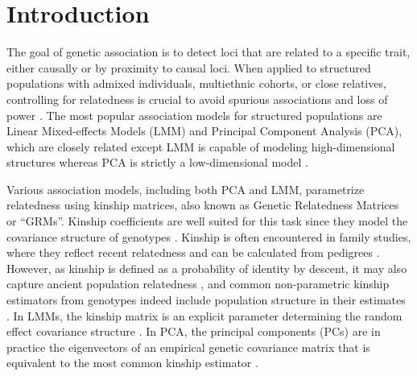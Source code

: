 \documentclass[11pt]{article}
\begin{document}
\clearpage

\section{Introduction}

The goal of genetic association is to detect loci that are related to a specific trait, either causally or by proximity to causal loci.
When applied to structured populations with admixed individuals, multiethnic cohorts, or close relatives, controlling for relatedness is crucial to avoid spurious associations and loss of power \citep{devlin_genomic_1999, voight_confounding_2005, astle_population_2009, yao_limitations_2022}.
The most popular association models for structured populations are Linear Mixed-effects Models (LMM) and Principal Component Analysis (PCA), which are closely related except LMM is capable of modeling high-dimensional structures whereas PCA is strictly a low-dimensional model \citep{astle_population_2009, hoffman_correcting_2013, yao_limitations_2022}.

Various association models, including both PCA and LMM, parametrize relatedness using kinship matrices, also known as Genetic Relatedness Matrices or ``GRMs''.
Kinship coefficients are well suited for this task since they model the covariance structure of genotypes \citep{malecot_mathematiques_1948, jacquard_structures_1970}.
Kinship is often encountered in family studies, where they reflect recent relatedness and can be calculated from pedigrees \citep{wright_coefficients_1922, emik_systematic_1949, garcia-cortes_novel_2015}.
However, as kinship is defined as a probability of identity by descent, it may also capture ancient population relatedness \citep{malecot_mathematiques_1948, astle_population_2009}, and common non-parametric kinship estimators from genotypes indeed include population structure in their estimates \citep{ochoa_estimating_2021}.
In LMMs, the kinship matrix is an explicit parameter determining the random effect covariance structure \citep{xie_combining_1998,yu_unified_2006, aulchenko_genomewide_2007, astle_population_2009, kang_efficient_2008, kang_variance_2010, zhou_genome-wide_2012, yang_advantages_2014, loh_efficient_2015, sul_population_2018}.
In PCA, the principal components (PCs) are in practice the eigenvectors of an empirical genetic covariance matrix that is equivalent to the most common kinship estimator \citep{price_principal_2006, astle_population_2009, hoffman_correcting_2013, yao_limitations_2022}.
\end{document}
